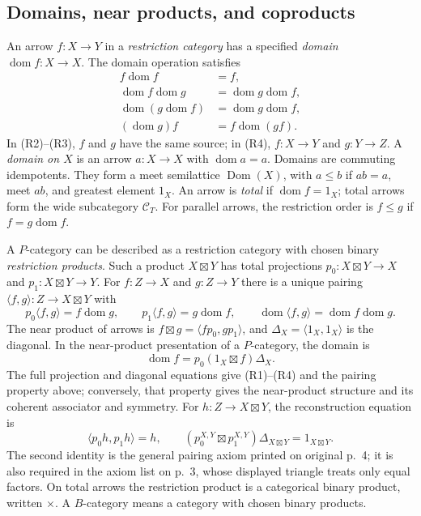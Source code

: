 \documentclass[11pt]{article}
\newcommand{\C}{\mathcal C}\newcommand{\D}{\mathcal D}\newcommand{\B}{\mathcal B}
\newcommand{\dom}{\operatorname{dom}}\newcommand{\ran}{\operatorname{ran}}
\begin{document}
\subsection{Domains, near products, and coproducts}
An arrow $f:X\to Y$ in a \emph{restriction category} has a specified
\emph{domain} $\dom f:X\to X$. The domain operation satisfies
\begin{align}
 f\dom f&=f,\tag{R1}\\
 \dom f\dom g&=\dom g\dom f,\tag{R2}\\
 \dom(g\dom f)&=\dom g\dom f,\tag{R3}\\
 (\dom g)f&=f\dom(gf).\tag{R4}
\end{align}
In (R2)--(R3), $f$ and $g$ have the same source; in (R4),
$f:X\to Y$ and $g:Y\to Z$. A \emph{domain on $X$} is an arrow
$a:X\to X$ with $\dom a=a$. Domains are commuting idempotents.
They form a meet semilattice $\operatorname{Dom}(X)$, with
$a\leq b$ if $ab=a$, meet $ab$, and greatest element $1_X$.
An arrow is \emph{total} if $\dom f=1_X$; total arrows form the
wide subcategory $\C_T$. For parallel arrows, the restriction order
is $f\leq g$ if $f=g\dom f$.

A $P$-category can be described as a restriction category with chosen binary
\emph{restriction products}. Such a product $X\boxtimes Y$ has total
projections $p_0:X\boxtimes Y\to X$ and
$p_1:X\boxtimes Y\to Y$. For $f:Z\to X$ and $g:Z\to Y$ there
is a unique pairing $\langle f,g\rangle:Z\to X\boxtimes Y$ with
\[
 p_0\langle f,g\rangle=f\dom g,\qquad
 p_1\langle f,g\rangle=g\dom f,\qquad
 \dom\langle f,g\rangle=\dom f\dom g.
\]
The near product of arrows is
$f\boxtimes g=\langle fp_0,gp_1\rangle$, and
$\Delta_X=\langle1_X,1_X\rangle$ is the diagonal. In the
near-product presentation of a $P$-category, the domain is
\[
 \dom f=p_0(1_X\boxtimes f)\Delta_X.
\]
The full projection and diagonal equations give (R1)--(R4) and the
pairing property above; conversely, that property gives the
near-product structure and its coherent associator and symmetry.
For $h:Z\to X\boxtimes Y$, the reconstruction equation is
\[
 \langle p_0h,p_1h\rangle=h,
 \qquad
 (p_0^{X,Y}\boxtimes p_1^{X,Y})\Delta_{X\boxtimes Y}
 =1_{X\boxtimes Y}.
\]
The second identity is the general pairing axiom printed on original p.~4; it is also required in the axiom list on p.~3, whose displayed triangle treats only equal factors. On total arrows the restriction product is a categorical binary
product, written $\times$. A $B$-category means a category with
chosen binary products.
\end{document}
